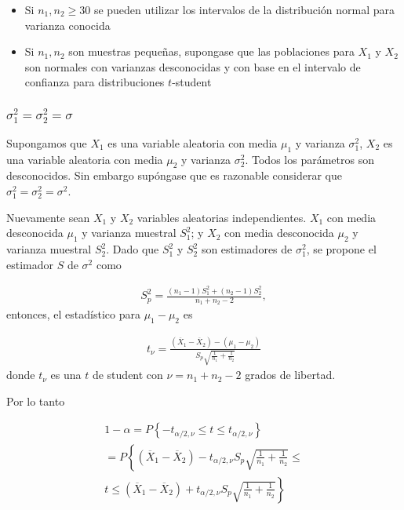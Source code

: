 \begin{itemize}
\item Si $n_{1},n_{2}\geq30$ se pueden utilizar los intervalos de la distribuci\'on normal para varianza conocida


\item Si $n_{1},n_{2}$ son muestras peque\~nas, supongase que las poblaciones para $X_{1}$ y $X_{2}$ son normales con varianzas desconocidas y con base en el intervalo de confianza para distribuciones $t$-student
\end{itemize}




\subsubsection*{$\sigma_{1}^{2}=\sigma_{2}^{2}=\sigma$}


Supongamos que $X_{1}$ es una variable aleatoria con media $\mu_{1}$ y varianza $\sigma_{1}^{2}$, $X_{2}$ es una variable aleatoria con media $\mu_{2}$ y varianza $\sigma_{2}^{2}$. Todos los par\'ametros son desconocidos. Sin embargo sup\'ongase que es razonable considerar que $\sigma_{1}^{2}=\sigma_{2}^{2}=\sigma^{2}$.\medskip

Nuevamente sean $X_{1}$ y $X_{2}$ variables aleatorias independientes. $X_{1}$ con media desconocida $\mu_{1}$ y varianza muestral $S_{1}^{2}$; y $X_{2}$ con media desconocida $\mu_{2}$ y varianza muestral $S_{2}^{2}$. Dado que $S_{1}^{2}$ y $S_{2}^{2}$ son estimadores de $\sigma_{1}^{2}$, se propone el estimador $S$ de $\sigma^{2}$ como 

\begin{eqnarray*}
S_{p}^{2}=\frac{\left(n_{1}-1\right)S_{1}^{2}+\left(n_{2}-1\right)S_{2}^{2}}{n_{1}+n_{2}-2},
\end{eqnarray*}
entonces, el estad\'istico para $\mu_{1}-\mu_{2}$ es

\begin{eqnarray*}
t_{\nu}=\frac{\left(\overline{X}_{1}-\overline{X}_{2}\right)-\left(\mu_{1}-\mu_{2}\right)}{S_{p}\sqrt{\frac{1}{n_{1}}+\frac{1}{n_{2}}}}
\end{eqnarray*}
donde $t_{\nu}$ es una $t$ de student con $\nu=n_{1}+n_{2}-2$ grados de libertad.\medskip

Por lo tanto







\begin{eqnarray*}
1-\alpha=P\left\{-t_{\alpha/2,\nu}\leq t\leq t_{\alpha/2,\nu}\right\}\\
=P\left\{\left(\overline{X}_{1}-\overline{X}_{2}\right)-t_{\alpha/2,\nu}S_{p}\sqrt{\frac{1}{n_{1}}+\frac{1}{n_{2}}}\leq \right.\\
\left.t\leq\left(\overline{X}_{1}-\overline{X}_{2}\right)+ t_{\alpha/2,\nu}S_{p}\sqrt{\frac{1}{n_{1}}+\frac{1}{n_{2}}}\right\}
\end{eqnarray*}

